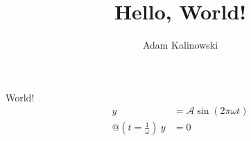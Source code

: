 \documentclass[10pt,a4paper]{article}
\author{Adam Kalinowski}
\title{Hello, World!}
\begin{document}
\maketitle
\begin{mdframed}[backgroundcolor=gray!30,frametitle=Hello,]
    World!
    \begin{align}
        y &= \mathscr{A}\sin\left( 2 \pi \omega t  \right)\\
        @ (t = \frac{1}{\omega}) \ y &= 0
    \end{align}
\end{mdframed}
\end{document}
